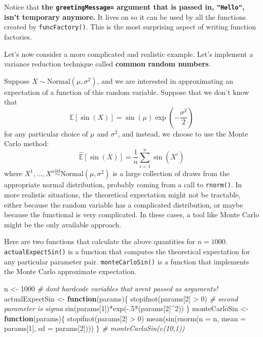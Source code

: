 \documentclass[
  12pt,
  krantz2]{krantz}
\makeatletter
\newenvironment{Shaded}{\begin{snugshade}}{\end{snugshade}}
\newcommand{\AttributeTok}[1]{\textcolor[rgb]{0.61,0.61,0.61}{#1}}
\newcommand{\CommentTok}[1]{\textcolor[rgb]{0.37,0.37,0.37}{\textit{#1}}}
\newcommand{\ControlFlowTok}[1]{\textcolor[rgb]{0.27,0.27,0.27}{\textbf{#1}}}
\newcommand{\DecValTok}[1]{\textcolor[rgb]{0.06,0.06,0.06}{#1}}
\newcommand{\FunctionTok}[1]{\textcolor[rgb]{0,0,0}{#1}}
\newcommand{\NormalTok}[1]{#1}
\newcommand{\OtherTok}[1]{\textcolor[rgb]{0.37,0.37,0.37}{#1}}
\newcommand{\SpecialCharTok}[1]{\textcolor[rgb]{0,0,0}{#1}}
\newenvironment{kframe}{%
\medskip{}
\setlength{\fboxsep}{.8em}
 \def\at@end@of@kframe{}%
 \ifinner\ifhmode%
  \def\at@end@of@kframe{\end{minipage}}%
  \begin{minipage}{\columnwidth}%
 \fi\fi%
 \def\FrameCommand##1{\hskip\@totalleftmargin \hskip-\fboxsep
 \colorbox{shadecolor}{##1}\hskip-\fboxsep
     \hskip-\linewidth \hskip-\@totalleftmargin \hskip\columnwidth}%
 \MakeFramed {\advance\hsize-\width
   \@totalleftmargin\z@ \linewidth\hsize
   \@setminipage}}%
 {\par\unskip\endMakeFramed%
 \at@end@of@kframe}
\renewenvironment{Shaded}{\begin{kframe}}{\end{kframe}}
\makeatother
\begin{document}
Notice that \textbf{the \texttt{greetingMessage=} argument that is passed in, \texttt{"Hello"}, isn't temporary anymore.} It lives on so it can be used by all the functions created by \texttt{funcFactory()}. This is the most surprising aspect of writing function factories.

Let's now consider a more complicated and realistic example. Let's implement a variance reduction technique called \textbf{common random numbers}.

Suppose \(X \sim \text{Normal}(\mu, \sigma^2)\), and we are interested in approximating an expectation of a function of this random variable. Suppose that we don't know that
\[
\mathbb{E}[\sin(X)] = \sin(\mu) \exp\left(-\frac{\sigma^2}{2}\right)
\]
for any particular choice of \(\mu\) and \(\sigma^2\), and instead, we choose to use the Monte Carlo method:
\[
\hat{\mathbb{E}}[\sin(X)] = \frac{1}{n}\sum_{i=1}^n\sin(X^i)
\]
where \(X^1, \ldots, X^n \overset{\text{iid}}{\sim} \text{Normal}(\mu, \sigma^2)\) is a large collection of draws from the appropriate normal distribution, probably coming from a call to \texttt{rnorm()}. In more realistic situations, the theoretical expectation might not be tractable, either because the random variable has a complicated distribution, or maybe because the functional is very complicated. In these cases, a tool like Monte Carlo might be the only available approach.

Here are two functions that calculate the above quantities for \(n=1000\). \texttt{actualExpectSin()} is a function that computes the theoretical expectation for any particular parameter pair. \texttt{monteCarloSin()} is a function that implements the Monte Carlo approximate expectation.

\begin{Shaded}
\begin{Highlighting}[]
\NormalTok{n }\OtherTok{\textless{}{-}} \DecValTok{1000} \CommentTok{\# don\textquotesingle{}t hardcode variables that aren\textquotesingle{}t passed as arguments!}
\NormalTok{actualExpectSin }\OtherTok{\textless{}{-}} \ControlFlowTok{function}\NormalTok{(params)\{}
  \FunctionTok{stopifnot}\NormalTok{(params[}\DecValTok{2}\NormalTok{] }\SpecialCharTok{\textgreater{}} \DecValTok{0}\NormalTok{) }\CommentTok{\# second parameter is sigma}
  \FunctionTok{sin}\NormalTok{(params[}\DecValTok{1}\NormalTok{])}\SpecialCharTok{*}\FunctionTok{exp}\NormalTok{(}\SpecialCharTok{{-}}\NormalTok{.}\DecValTok{5}\SpecialCharTok{*}\NormalTok{(params[}\DecValTok{2}\NormalTok{]}\SpecialCharTok{\^{}}\DecValTok{2}\NormalTok{))}
\NormalTok{\}}
\NormalTok{monteCarloSin }\OtherTok{\textless{}{-}} \ControlFlowTok{function}\NormalTok{(params)\{}
  \FunctionTok{stopifnot}\NormalTok{(params[}\DecValTok{2}\NormalTok{] }\SpecialCharTok{\textgreater{}} \DecValTok{0}\NormalTok{) }
  \FunctionTok{mean}\NormalTok{(}\FunctionTok{sin}\NormalTok{(}\FunctionTok{rnorm}\NormalTok{(}\AttributeTok{n =}\NormalTok{ n, }\AttributeTok{mean =}\NormalTok{ params[}\DecValTok{1}\NormalTok{], }\AttributeTok{sd =}\NormalTok{ params[}\DecValTok{2}\NormalTok{])))}
\NormalTok{\}}
\CommentTok{\# monteCarloSin(c(10,1))}
\end{Highlighting}
\end{Shaded}
\end{document}
